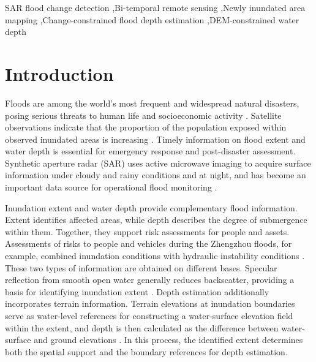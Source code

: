 \documentclass[authoryear,preprint,12pt]{elsarticle}
\begin{document}
\begin{frontmatter}
\begin{abstract}
\end{abstract}

\begin{keyword}
SAR flood change detection \sep Bi-temporal remote sensing \sep Newly inundated area mapping \sep Change-constrained flood depth estimation \sep DEM-constrained water depth
\end{keyword}

\end{frontmatter}

\section{Introduction}

Floods are among the world's most frequent and widespread natural disasters, posing serious threats to human life and socioeconomic activity \citep{credUndrr2020disasters}. Satellite observations indicate that the proportion of the population exposed within observed inundated areas is increasing \citep{tellman2021exposure}. Timely information on flood extent and water depth is essential for emergency response and post-disaster assessment. Synthetic aperture radar (SAR) uses active microwave imaging to acquire surface information under cloudy and rainy conditions and at night, and has become an important data source for operational flood monitoring \citep{wagner2026gfm}.

Inundation extent and water depth provide complementary flood information. Extent identifies affected areas, while depth describes the degree of submergence within them. Together, they support risk assessments for people and assets. Assessments of risks to people and vehicles during the Zhengzhou floods, for example, combined inundation conditions with hydraulic instability conditions \citep{dong2022urbanrisk}. These two types of information are obtained on different bases. Specular reflection from smooth open water generally reduces backscatter, providing a basis for identifying inundation extent \citep{amitrano2024sarFloodReview}. Depth estimation additionally incorporates terrain information. Terrain elevations at inundation boundaries serve as water-level references for constructing a water-surface elevation field within the extent, and depth is then calculated as the difference between water-surface and ground elevations \citep{cian2018flood}. In this process, the identified extent determines both the spatial support and the boundary references for depth estimation.
\end{document}

